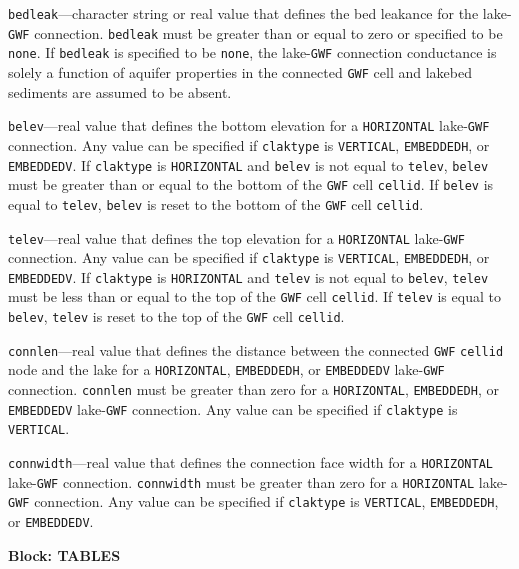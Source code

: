 \begin{description}
\item \texttt{bedleak}---character string or real value that defines the bed leakance for the lake-\texttt{GWF} connection. \texttt{bedleak} must be greater than or equal to zero or specified to be \texttt{none}. If \texttt{bedleak} is specified to be \texttt{none}, the lake-\texttt{GWF} connection conductance is solely a function of aquifer properties in the connected \texttt{GWF} cell and lakebed sediments are assumed to be absent.

\item \texttt{belev}---real value that defines the bottom elevation for a \texttt{HORIZONTAL} lake-\texttt{GWF} connection. Any value can be specified if \texttt{claktype} is \texttt{VERTICAL}, \texttt{EMBEDDEDH}, or \texttt{EMBEDDEDV}. If \texttt{claktype} is \texttt{HORIZONTAL} and \texttt{belev} is not equal to \texttt{telev}, \texttt{belev} must be greater than or equal to the bottom of the \texttt{GWF} cell \texttt{cellid}. If \texttt{belev} is equal to \texttt{telev}, \texttt{belev} is reset to the bottom of the \texttt{GWF} cell \texttt{cellid}.

\item \texttt{telev}---real value that defines the top elevation for a \texttt{HORIZONTAL} lake-\texttt{GWF} connection. Any value can be specified if \texttt{claktype} is \texttt{VERTICAL}, \texttt{EMBEDDEDH}, or \texttt{EMBEDDEDV}. If \texttt{claktype} is \texttt{HORIZONTAL} and \texttt{telev} is not equal to \texttt{belev}, \texttt{telev} must be less than or equal to the top of the \texttt{GWF} cell \texttt{cellid}. If \texttt{telev} is equal to \texttt{belev}, \texttt{telev} is reset to the top of the \texttt{GWF} cell \texttt{cellid}.

\item \texttt{connlen}---real value that defines the distance between the connected \texttt{GWF} \texttt{cellid} node and the lake for a \texttt{HORIZONTAL}, \texttt{EMBEDDEDH}, or \texttt{EMBEDDEDV} lake-\texttt{GWF} connection. \texttt{connlen} must be greater than zero for a \texttt{HORIZONTAL}, \texttt{EMBEDDEDH}, or \texttt{EMBEDDEDV} lake-\texttt{GWF} connection. Any value can be specified if \texttt{claktype} is \texttt{VERTICAL}.

\item \texttt{connwidth}---real value that defines the connection face width for a \texttt{HORIZONTAL} lake-\texttt{GWF} connection. \texttt{connwidth} must be greater than zero for a \texttt{HORIZONTAL} lake-\texttt{GWF} connection. Any value can be specified if \texttt{claktype} is \texttt{VERTICAL}, \texttt{EMBEDDEDH}, or \texttt{EMBEDDEDV}.

\end{description}
\item \textbf{Block: TABLES}

